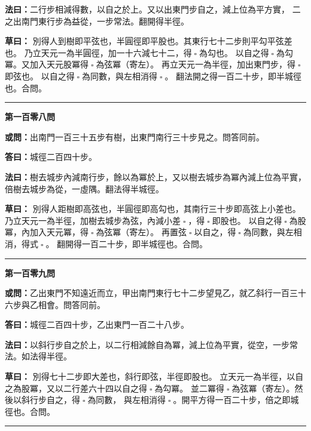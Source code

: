 \documentclass[11pt,a4paper]{article}
\let\origsquare\square
\renewcommand{\square}{\ensuremath{\origsquare}}%
\newcommand{\longline}{\noindent\rule{\textwidth}{0.4pt}}
\newcommand{\owen}[1]{%
  \par\vspace{0.4em}%
  \noindent\textcolor{problemcolor}{\textbf{或問：}}{\tradfont #1}\par\nopagebreak%
}
\newcommand{\fayue}[1]{%
  \par\noindent\textcolor{methodcolor}{\textbf{法曰：}}{\tradfont #1}\par\nopagebreak%
}
\newcommand{\tsaoyue}[1]{%
  \par\noindent\textcolor{workcolor}{\textbf{草曰：}}{\tradfont #1}\par%
}
\newcommand{\dayue}[1]{%
  \par\noindent\textcolor{anscolor}{\textbf{答曰：}}{\tradfont #1}\par\nopagebreak%
}
\newcommand{\wen}[1]{\par\vspace{0.3em}\noindent\textcolor{problemcolor}{\textbf{第#1問}}\par}
\begin{document}
\fayue{二行步相減得數，以自之於上。又以出東門步自之，減上位為平方實，
二之出南門東行步為益從，一步常法。翻開得半徑。}

\tsaoyue{%
別得人到樹即平弦也，半圓徑即平股也。其東行七十二步則平勾平弦差也。
乃立天元一為半圓徑，加一十六減七十二，得$ \; \square \; $為勾也。
以自之得$ \; \square \; $為勾冪。又加入天元股冪得$ \; \square \; $為弦冪（寄左）。
再立天元一為半徑，加出東門步，得$ \; \square \; $即弦也。
以自之得$ \; \square \; $為同數，與左相消得$ \; \square \; $。
翻法開之得一百二十步，即半城徑也。合問。}

\vspace{0.5cm}
\begin{center}
\longline
\end{center}

\wen{一百零八}
\owen{出南門一百三十五步有樹，出東門南行三十步見之。問答同前。}
\dayue{城徑二百四十步。}

\fayue{樹去城步內減南行步，餘以為冪於上，又以樹去城步為冪內減上位為平實，
倍樹去城步為從，一虛隅。翻法得半城徑。}

\tsaoyue{%
別得人距樹即高弦也，半圓徑即高勾也，其南行三十步即高弦上小差也。
乃立天元一為半徑，加樹去城步為弦，內減小差$ \; \square \; $，得$ \; \square \; $即股也。
以自之得$ \; \square \; $為股冪，內加入天元冪，得$ \; \square \; $為弦冪（寄左）。
再置弦$ \; \square \; $以自之，得$ \; \square \; $為同數，與左相消，得式$ \; \square \; $。
翻開得一百二十步，即半城徑也。合問。}

\vspace{0.5cm}
\begin{center}
\longline
\end{center}

\wen{一百零九}
\owen{乙出東門不知遠近而立，甲出南門東行七十二步望見乙，就乙斜行一百三十六步與乙相會。問答同前。}
\dayue{城徑二百四十步，乙出東門一百二十八步。}

\fayue{以斜行步自之於上，以二行相減餘自為冪，減上位為平實，從空，一步常法。如法得半徑。}

\tsaoyue{%
別得七十二步即大差也，斜行即弦，半徑即股也。
立天元一為半徑，以自之為股冪，又以二行差六十四以自之得$ \; \square \; $為勾冪。
並二冪得$ \; \square \; $為弦冪（寄左）。然後以斜行步自之，得$ \; \square \; $為同數，
與左相消得$ \; \square \; $。開平方得一百二十步，倍之即城徑也。合問。}

\vspace{0.5cm}
\begin{center}
\longline
\end{center}
\end{document}

